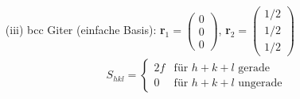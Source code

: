 \begin{itemize}
\begin{itemize}
\begin{itemize}
            \item[(iii)] bcc Giter (einfache Basis): \textbf{r}$_1 = \left(\begin{array}{c} 0 \\ 0 \\ 0 \end{array}\right)$, \textbf{r}$_2 = \left(\begin{array}{c} 1/2 \\ 1/2 \\ 1/2 \end{array}\right)$
            \begin{align*}
                S_{hkl} = \begin{cases}
                    2f & \text{für $h+k+l$ gerade}\\
                    0 & \text{für $h+k+l$ ungerade}
                \end{cases}
            \end{align*}


\end{itemize}
\end{itemize}
\end{itemize}
